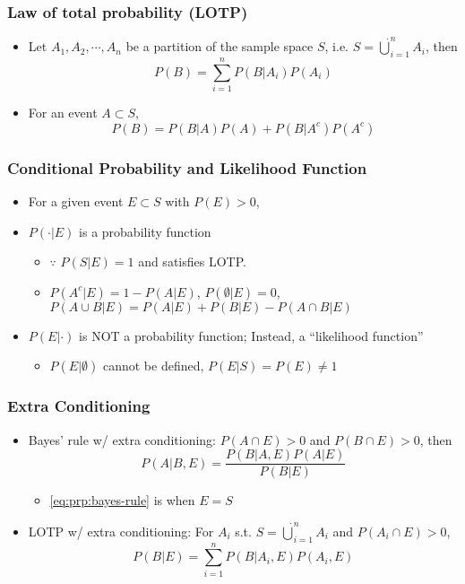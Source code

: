 \subsubsection*{Law of total probability (LOTP)}
\begin{itemize}
    \item Let $A_1,A_2,\cdots,A_n$ be a partition of the sample space $S$, i.e. $S=\dot{\bigcup}_{i=1}^nA_i$, then
    \begin{equation}
        P(B)=\sum_{i=1}^nP(B|A_i)P(A_i)
    \end{equation}
    \item For an event $A\subset S$,
    \begin{equation}
        P(B)=P(B|A)P(A)+P(B|A^c)P(A^c)
    \end{equation}
\end{itemize}

\subsubsection*{Conditional Probability and Likelihood Function}
\begin{itemize}
    \item For a given event $E\subset S$ with $P(E)>0$,
    \item $P(\cdot|E)$ is a probability function
    \begin{itemize}
        \item $\because$ $P(S|E)=1$ and satisfies LOTP.
        \item $P(A^c|E)=1-P(A|E)$, $P(\emptyset|E)=0$, $P(A\cup B|E)=P(A|E)+P(B|E)-P(A\cap B|E)$
    \end{itemize}
    \item $P(E|\cdot)$ is NOT a probability function; Instead, a ``likelihood function''
    \begin{itemize}
        \item $P(E|\emptyset)$ cannot be defined, $P(E|S)=P(E)\neq 1$
    \end{itemize}
\end{itemize}

\subsubsection*{Extra Conditioning}
\begin{itemize}
    \item Bayes' rule w/ extra conditioning: $P(A\cap E)>0$ and $P(B\cap E)>0$, then
    \begin{equation}
        P(A|B,E)=\frac{P(B|A,E)P(A|E)}{P(B|E)}
    \end{equation}
    \begin{itemize}
        \item \ref{eq:prp:bayes-rule} is when $E=S$
    \end{itemize}
    \item LOTP w/ extra conditioning: For $A_i$ s.t. $S=\dot{\bigcup}_{i=1}^nA_i$ and $P(A_i\cap E)>0$,
    \begin{equation}
        P(B|E)=\sum_{i=1}^nP(B|A_i,E)P(A_i,E)
    \end{equation}
\end{itemize}

